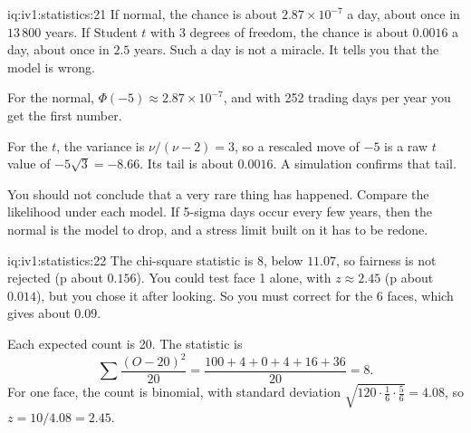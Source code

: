 \begin{solution}{iq:iv1:statistics:21}
If normal, the chance is about $2.87 \times 10^{-7}$ a day, about once in $13\,800$ years. If Student $t$ with 3 degrees of freedom, the chance is about $0.0016$ a day, about once in $2.5$ years. Such a day is not a miracle. It tells you that the model is wrong.

For the normal, $\Phi(-5) \approx 2.87 \times 10^{-7}$, and with 252 trading days per year you get the first number.

For the $t$, the variance is $\nu/(\nu - 2) = 3$, so a rescaled move of $-5$ is a raw $t$ value of $-5\sqrt{3} = -8.66$. Its tail is about $0.0016$. A simulation confirms that tail.

You should not conclude that a very rare thing has happened. Compare the likelihood under each model. If 5-sigma days occur every few years, then the normal is the model to drop, and a stress limit built on it has to be redone.

\end{solution}

\begin{solution}{iq:iv1:statistics:22}
The chi-square statistic is 8, below $11.07$, so fairness is not rejected (p about $0.156$). You could test face 1 alone, with $z \approx 2.45$ (p about $0.014$), but you chose it after looking. So you must correct for the 6 faces, which gives about $0.09$.

Each expected count is 20. The statistic is
\[
\sum \frac{(O - 20)^2}{20} = \frac{100 + 4 + 0 + 4 + 16 + 36}{20} = 8.
\]
For one face, the count is binomial, with standard deviation $\sqrt{120 \cdot \frac16 \cdot \frac56} = 4.08$, so $z = 10/4.08 = 2.45$.

\end{solution}


